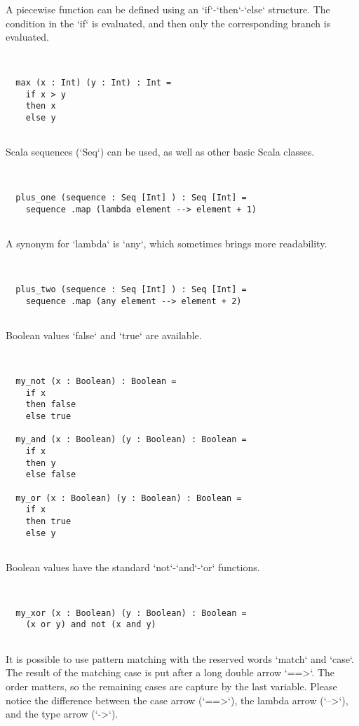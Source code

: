 \documentclass[12pt,a4paper]{article}
\begin{document}
  A piecewise function can be defined using an `if`-`then`-`else` structure. The condition in
   the `if` is evaluated, and then only the corresponding branch is evaluated.


\begin{lstlisting}


  max (x : Int) (y : Int) : Int =
    if x > y
    then x
    else y


\end{lstlisting}

  Scala sequences (`Seq`) can be used, as well as other basic Scala classes.


\begin{lstlisting}


  plus_one (sequence : Seq [Int] ) : Seq [Int] =
    sequence .map (lambda element --> element + 1)


\end{lstlisting}

  A synonym for `lambda` is `any`, which sometimes brings more readability.


\begin{lstlisting}


  plus_two (sequence : Seq [Int] ) : Seq [Int] =
    sequence .map (any element --> element + 2)


\end{lstlisting}

  Boolean values `false` and `true` are available.


\begin{lstlisting}


  my_not (x : Boolean) : Boolean =
    if x
    then false
    else true

  my_and (x : Boolean) (y : Boolean) : Boolean =
    if x
    then y
    else false

  my_or (x : Boolean) (y : Boolean) : Boolean =
    if x
    then true
    else y


\end{lstlisting}

  Boolean values have the standard `not`-`and`-`or` functions.


\begin{lstlisting}


  my_xor (x : Boolean) (y : Boolean) : Boolean =
    (x or y) and not (x and y)


\end{lstlisting}

  It is possible to use pattern matching with the reserved words `match` and `case`.
   The result of the matching case is put after a long double arrow `==>`.
   The order matters, so the remaining cases are capture by the last variable.
   Please notice the difference between the case arrow (`==>`), the lambda arrow (`-->`), and
   the type arrow (`->`).
\end{document}
